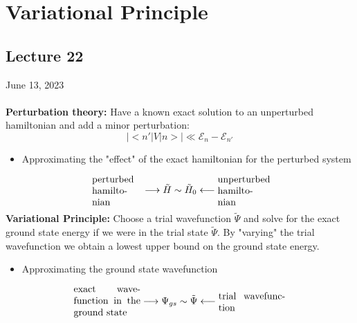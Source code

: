 \documentclass[12pt,fancychapters]{report}
\numberwithin{equation}{section}
\begin{document}
\chapter{Variational Principle}
\section{Lecture 22}
June 13, 2023\\
\\
\textbf{Perturbation theory:} Have a known exact solution to an unperturbed hamiltonian 
and add a minor perturbation:
\[
  \big|\big<n'\big|V\big|n \big>\big| \ll \mathcal{E}_n - \mathcal{E}_{n'}
\]
\begin{itemize}
  \item Approximating the "effect" of the exact hamiltonian for the perturbed system
\end{itemize}
\[
  \parbox{0.15\textwidth}{perturbed hamiltonian}\longrightarrow \tilde{H}\sim \tilde{H}_0
  \longleftarrow \parbox{0.15\textwidth}{unperturbed hamiltonian}
\]
\textbf{Variational Principle: } Choose a trial wavefunction $\tilde{\Psi}$ and solve for the 
exact ground state energy if we were in the trial state $\tilde{\Psi}$. By "varying" the trial 
wavefunction we obtain a lowest upper bound on the ground state energy.
\begin{itemize}
  \item Approximating the ground state wavefunction
\end{itemize}
\[
  \parbox{0.2\textwidth}{exact wavefunction in the ground state}\longrightarrow \Psi_{gs} \sim
  \tilde{\Psi}\longleftarrow \parbox{0.2\textwidth}{trial wavefunction}
\]
\end{document}
